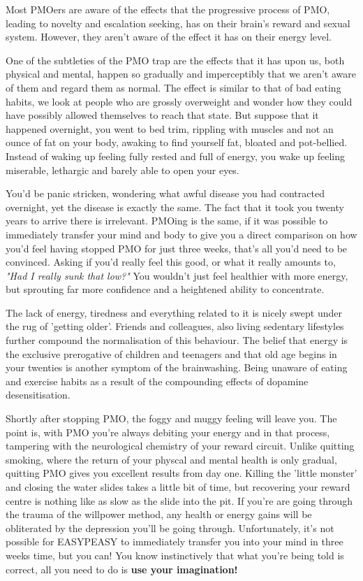 \documentclass[easypeasy.tex]{subfiles}
\begin{document}
Most PMOers are aware of the effects that the progressive process of PMO, leading to novelty and escalation seeking, has on their brain's reward and sexual system. However, they aren't aware of the effect it has on their energy level.

One of the subtleties of the PMO trap are the effects that it has upon us, both physical and mental, happen so gradually and imperceptibly that we aren't aware of them and regard them as normal. The effect is similar to that of bad eating habits, we look at people who are grossly overweight and wonder how they could have possibly allowed themselves to reach that state. But suppose that it happened overnight, you went to bed trim, rippling with muscles and not an ounce of fat on your body, awaking to find yourself fat, bloated and pot-bellied. Instead of waking up feeling fully rested and full of energy, you wake up feeling miserable, lethargic and barely able to open your eyes.

You'd be panic stricken, wondering what awful disease you had contracted overnight, yet the disease is exactly the same. The fact that it took you twenty years to arrive there is irrelevant. PMOing is the same, if it was possible to immediately transfer your mind and body to give you a direct comparison on how you'd feel having stopped PMO for just three weeks, that's all you'd need to be convinced. Asking if you'd really feel this good, or what it really amounts to, \textit{"Had I really sunk that low?"} You wouldn't just feel healthier with more energy, but sprouting far more confidence and a heightened ability to concentrate.

The lack of energy, tiredness and everything related to it is nicely swept under the rug of 'getting older'. Friends and colleagues, also living sedentary lifestyles further compound the normalisation of this behaviour. The belief that energy is the exclusive prerogative of children and teenagers and that old age begins in your twenties is another symptom of the brainwashing. Being unaware of eating and exercise habits as a result of the compounding effects of dopamine desensitisation.

Shortly after stopping PMO, the foggy and muggy feeling will leave you. The point is, with PMO you're always debiting your energy and in that process, tampering with the neurological chemistry of your reward circuit. Unlike quitting smoking, where the return of your physcal and mental health is only gradual, quitting PMO gives you excellent results from day one. Killing the 'little monster' and closing the water slides takes a little bit of time, but recovering your reward centre is nothing like as slow as the slide into the pit. If you're are going through the trauma of the willpower method, any health or energy gains will be obliterated by the depression you'll be going through. Unfortunately, it's not possible for EASYPEASY to immediately transfer you into your mind in three weeks time, but you can! You know instinctively that what you're being told is correct, all you need to do is \textbf{use your imagination!}
\end{document}

